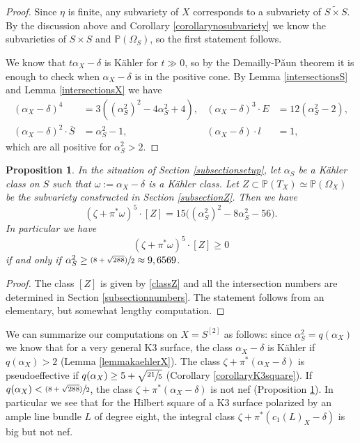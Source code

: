 \documentclass[11pt]{article}
\newcommand{\psfrac}[2]{\sfrac{(#1)}{#2}}
\theoremstyle{plain}
\newtheorem{proposition}[theorem]{Proposition}
\theoremstyle{definition}
\newcommand{\PP}{\ensuremath{\mathbb{P}}}
\newcommand{\barS}{\ensuremath{\overline{S}}}
\newcommand{\blS}{\ensuremath{\widetilde{S \times S}}}
\begin{document}
\begin{proof}
Since $\eta$ is finite, any subvariety of $X$ corresponds to a subvariety of $\blS$. By the discussion above
and Corollary \ref{corollarynosubvariety}
we know the subvarieties of $S \times S$ and $\PP(\Omega_S)$, so the first statement follows.

We know that $t \alpha_X-\delta$ is Kähler for $t \gg 0$, so by the Demailly-P\v aun theorem it is enough to check when
$\alpha_X-\delta$ is in the positive cone. By Lemma \ref{intersectionsS} and Lemma \ref{intersectionsX} we have
\begin{align*}
(\alpha_X-\delta)^4 &= 3 ((\alpha_S^2)^2-4\alpha_S^2+4), &
(\alpha_X-\delta)^3 \cdot E &= 12 (\alpha_S^2-2),
\\
(\alpha_X-\delta)^2 \cdot \barS &= \alpha_S^2-1, &
(\alpha_X-\delta) \cdot l &= 1,
\end{align*}
which are all positive for $\alpha_S^2>2$.
\end{proof}

\begin{proposition} \label{propositionthenumber}
In the situation of Section \ref{subsectionsetup}, let
$\alpha_S$ be a Kähler class on $S$ such that $\omega:= \alpha_X-\delta$ is a Kähler class.
Let $Z \subset \PP(T_X) \simeq \PP(\Omega_X) $ be the subvariety constructed in Section \ref{subsectionZ}. Then we have
\[
(\zeta + \pi^* \omega)^5 \cdot [Z] =
15 \bigl(
(\alpha_S^2)^2 - 8 \alpha_S^2 - 56
\bigr).
\]
In particular we have
\[
(\zeta + \pi^* \omega)^5 \cdot [Z] \geq 0
\]
if and only if $\alpha_S^2 \geq \psfrac{8+\sqrt{288}}{2} \approx 9,6569$.
\end{proposition}

\begin{proof}
The class $[Z]$ is given by \eqref{classZ} and all the intersection numbers are determined in Section \ref{subsectionnumbers}. The statement follows from an elementary, but somewhat lengthy computation.
\end{proof}

We can summarize our computations on $X=S^{[2]}$ as follows:
since $\alpha_S^2=q(\alpha_X)$ we know that
for a very general K3 surface, the class $\alpha_X-\delta$ is Kähler if $q(\alpha_X)>2$ (Lemma \ref{lemmakaehlerX}).
The class $\zeta+\pi^*(\alpha_X-\delta)$ is pseudoeffective if $q(\alpha_X)\geq 5+\sqrt{\sfrac{21}{5}}$ (Corollary \ref{corollaryK3square}).
If $q(\alpha_X) < \psfrac{8+\sqrt{288}}{2}$, the class $\zeta+\pi^*(\alpha_X-\delta)$ is not nef (Proposition \ref{propositionthenumber}).
In particular we see that for the Hilbert square of a K3 surface polarized by an ample line bundle $L$ of degree eight, the integral class $\zeta+\pi^*(c_1(L)_X-\delta)$ is big but not nef.
\end{document}
